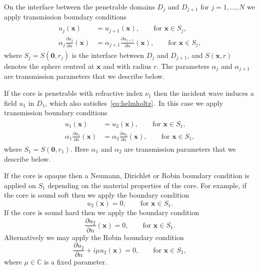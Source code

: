 \documentclass[11pt,letterpaper]{article}
\newcommand{\x}{\boldsymbol{x}}
\newcommand{\zero}{\boldsymbol{0}}
\newcommand{\bbC}{\mathbb{C}}
\newcommand{\ri}{\nu}
\begin{document}
On the interface between the
penetrable domains $D_j$ and $D_{j+1}$ for $j=1,\dots,N$ we
apply transmission boundary conditions
\begin{align}
  \label{eq:transmission-inner}
  \begin{split}
    u_{j}(\x) & = u_{j+1}(\x), \qquad \mbox{for $\x \in S_j$},\\
    \alpha_j \frac{\partial u_j}{\partial n}(\x) & =
    \alpha_{j+1}\frac{\partial u_{j+1}}{\partial n}(\x),    
     \qquad \mbox{for $\x \in S_j$},
  \end{split}
\end{align}
where $S_j = S(\zero,r_j)$ is the interface between 
$D_j$ and $D_{j+1}$,
and $S(\x,r)$ denotes the sphere centred at $\x$ and with radius $r$.
The parameters $\alpha_j$ and $\alpha_{j+1}$ are transmission parameters
that we describe
below.


If the core is penetrable with refractive index
$\ri_1$ then the incident wave induces
a field $u_1$ in $D_1$, which also satisfies~\eqref{eq:helmholtz}.\
In this case we
apply transmission boundary conditions
\begin{align}
  \label{eq:transmission-core}
  \begin{split}
    u_{1}(\x) & = u_{2}(\x), \qquad \mbox{for $\x \in S_1$},\\
    \alpha_1 \frac{\partial u_1}{\partial n}(\x) & =
    \alpha_2 \frac{\partial u_{2}}{\partial n}(\x),    
     \qquad \mbox{for $\x \in S_1$},
  \end{split}
\end{align}
where $S_1 = S(\zero,r_1)$.
Here $\alpha_1$ and $\alpha_{2}$ are transmission parameters that we describe
below.

If the core is opaque then a Neumann, Dirichlet or Robin boundary condition
is applied on $S_1$ depending on the material properties of the core.
For example, if the core is sound soft then we apply the boundary
condition
\begin{equation}
  \label{eq:soft}
  u_2(\x) = 0, \qquad \mbox{for $\x \in S_1$}.
\end{equation}
If the core is sound hard then we apply the boundary condition
\begin{equation}
  \label{eq:hard}
  \frac{\partial u_2}{\partial n}(\x) = 0, \qquad \mbox{for $\x \in S_1$}.
\end{equation}
Alternatively we may apply the Robin boundary condition
\begin{equation}
  \label{eq:robin}
   \frac{\partial u_2}{\partial n} + i \mu u_2(\x) = 0, \qquad \mbox{for $\x \in S_1$},
\end{equation}
where $\mu \in \bbC$ is a fixed parameter.
\end{document}
